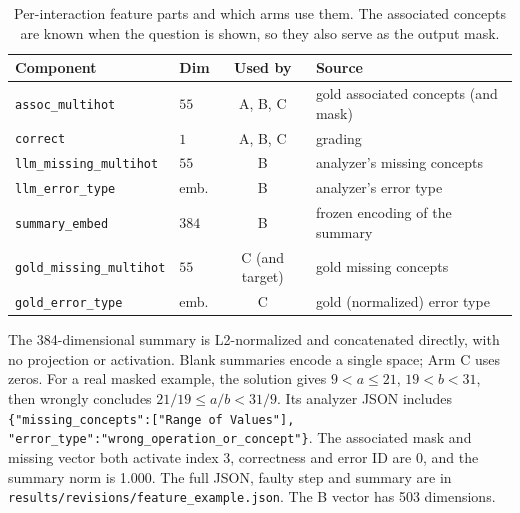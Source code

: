 \documentclass[11pt]{article}
\newcommand{\code}[1]{\texttt{\small #1}}
\begin{document}
\begin{table}[t]
\centering
\caption{Per-interaction feature parts and which arms use them. The associated
concepts are known when the question is shown, so they also serve as the output mask.}
\label{tab:features}
\small
\begin{tabular}{@{}llcl@{}}
\toprule
\textbf{Component} & \textbf{Dim} & \textbf{Used by} & \textbf{Source}\\
\midrule
\code{assoc\_multihot}        & $55$  & A, B, C & gold associated concepts (and mask)\\
\code{correct}                & $1$   & A, B, C & grading\\
\code{llm\_missing\_multihot} & $55$  & B       & analyzer's missing concepts\\
\code{llm\_error\_type}       & emb.  & B       & analyzer's error type\\
\code{summary\_embed}         & $384$ & B       & frozen encoding of the summary\\
\code{gold\_missing\_multihot}& $55$  & C (and target) & gold missing concepts\\
\code{gold\_error\_type}      & emb.  & C       & gold (normalized) error type\\
\bottomrule
\end{tabular}
\end{table}

The 384-dimensional summary is L2-normalized and concatenated directly, with no
projection or activation. Blank summaries encode a single space; Arm C uses zeros.
For a real masked example, the solution gives $9<a\leq21$, $19<b<31$, then wrongly
concludes $21/19\leq a/b<31/9$. Its analyzer JSON includes
\code{\{"missing\_concepts":["Range of Values"],}
\code{"error\_type":"wrong\_operation\_or\_concept"\}}.
The associated mask and missing vector both activate index 3, correctness and error
ID are 0, and the summary norm is 1.000. The full JSON, faulty step and summary are
in \code{results/revisions/feature\_example.json}. The B vector has 503 dimensions.
\end{document}
